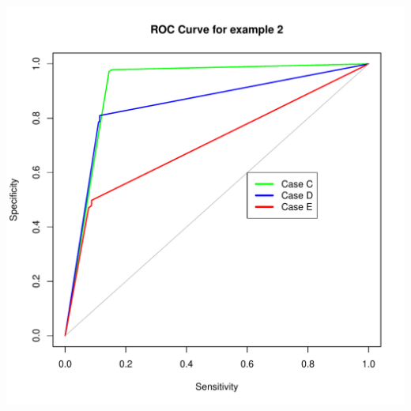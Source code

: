 \documentclass{article}\usepackage[]{graphicx}\usepackage[]{color}
\makeatletter
\def\maxwidth{ %
  \ifdim\Gin@nat@width>\linewidth
    \linewidth
  \else
    \Gin@nat@width
  \fi
}
\newenvironment{knitrout}{}{} %
\makeatother
\begin{document}
\begin{knitrout}
\color{fgcolor}
\includegraphics[width=\maxwidth]{figure/unnamed-chunk-3-1} 

\end{knitrout}
\end{document}
